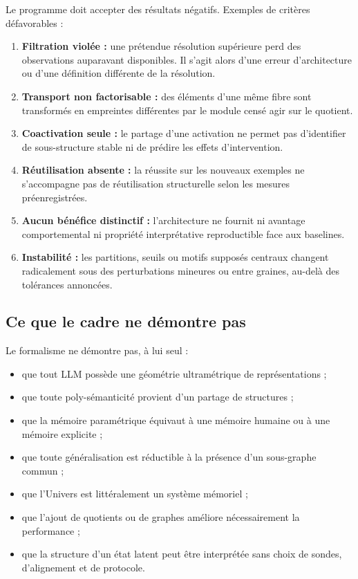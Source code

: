 \documentclass[11pt,a4paper]{article}
\theoremstyle{remark}
\newcommand{\1}{\mathbf 1}
\begin{document}
Le programme doit accepter des résultats négatifs. Exemples de critères défavorables :
\begin{enumerate}[label=\textbf{F\arabic*.}]
  \item \textbf{Filtration violée :} une prétendue résolution supérieure perd des observations auparavant disponibles. Il s'agit alors d'une erreur d'architecture ou d'une définition différente de la résolution.
  \item \textbf{Transport non factorisable :} des éléments d'une même fibre sont transformés en empreintes différentes par le module censé agir sur le quotient.
  \item \textbf{Coactivation seule :} le partage d'une activation ne permet pas d'identifier de sous-structure stable ni de prédire les effets d'intervention.
  \item \textbf{Réutilisation absente :} la réussite sur les nouveaux exemples ne s'accompagne pas de réutilisation structurelle selon les mesures préenregistrées.
  \item \textbf{Aucun bénéfice distinctif :} l'architecture ne fournit ni avantage comportemental ni propriété interprétative reproductible face aux baselines.
  \item \textbf{Instabilité :} les partitions, seuils ou motifs supposés centraux changent radicalement sous des perturbations mineures ou entre graines, au-delà des tolérances annoncées.
\end{enumerate}

\subsection{Ce que le cadre ne démontre pas}
Le formalisme ne démontre pas, à lui seul :
\begin{itemize}
  \item que tout LLM possède une géométrie ultramétrique de représentations ;
  \item que toute poly-sémanticité provient d'un partage de structures ;
  \item que la mémoire paramétrique équivaut à une mémoire humaine ou à une mémoire explicite ;
  \item que toute généralisation est réductible à la présence d'un sous-graphe commun ;
  \item que l'Univers est littéralement un système mémoriel ;
  \item que l'ajout de quotients ou de graphes améliore nécessairement la performance ;
  \item que la structure d'un état latent peut être interprétée sans choix de sondes, d'alignement et de protocole.
\end{itemize}
\end{document}
